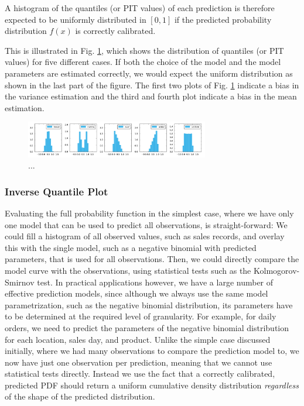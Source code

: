 \documentclass[BCOR=1mm, DIV=calc,10pt,
twoside=true,
twocolumn,
headings=normal]{scrartcl}
\newcommand{\fig}{Fig. }
\begin{document}
A histogram of the quantiles (or PIT values) of each prediction is therefore expected to be uniformly distributed in $[0,1]$ if the predicted probability distribution $f(x)$ is correctly calibrated.

This is illustrated in \fig \ref{fig:cdf_histos}, which shows the distribution of quantiles (or PIT values) for five different cases. If both the choice of the model and the model parameters are estimated correctly, we would expect the uniform distribution as shown in the last part of the figure. The first two plots of \fig \ref{fig:cdf_histos} indicate a bias in the variance estimation and the third and fourth plot indicate a bias in the mean
estimation.

\begin{figure}
\begin{center}
\includegraphics[width=8cm]{../figures/cdf_histos}
\caption{\label{fig:cdf_histos} ...}
\end{center}
\end{figure}

\subsubsection{Inverse Quantile Plot}
Evaluating the full probability function in the simplest case, where we have only one model that can be used to predict all observations, is straight-forward: We could fill a histogram of all observed values, such as sales records, and overlay this with the single model, such as a negative binomial with predicted parameters, that is used for all observations. Then, we could directly compare the model curve with the observations, using statistical tests such as the Kolmogorov-Smirnov test. In practical applications however, we have a large number of effective prediction models, since although we always use the same model parametrization, such as the negative binomial distribution, its parameters have to be determined at the required level of granularity. For example, for daily orders, we need to predict the parameters of the negative binomial distribution for each location, sales day, and product. Unlike the simple case discussed initially, where we had many observations to compare the prediction model to, we now have just one observation per prediction, meaning that we cannot use statistical tests directly. Instead we use the fact that a correctly calibrated, predicted PDF should return a uniform cumulative density distribution {\em regardless} of the shape of the predicted distribution.
\end{document}
